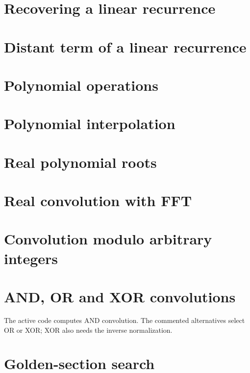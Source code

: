 \section{Recovering a linear recurrence}

\section{Distant term of a linear recurrence}

\section{Polynomial operations}

\section{Polynomial interpolation}

\section{Real polynomial roots}

\section{Real convolution with FFT}

\section{Convolution modulo arbitrary integers}

\section{AND, OR and XOR convolutions}
The active code computes AND convolution. The commented alternatives select OR or XOR; XOR also needs the inverse normalization.

\section{Golden-section search}

